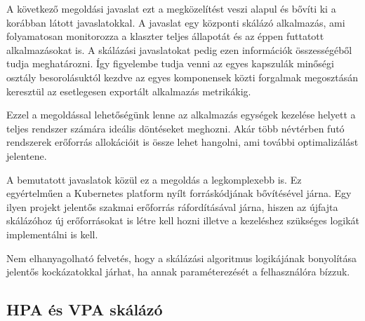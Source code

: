 A következő megoldási javaslat ezt a megközelítést veszi alapul és bővíti ki a korábban látott javaslatokkal.
A javaslat egy központi skálázó alkalmazás, ami folyamatosan monitorozza a klaszter teljes állapotát és az éppen futtatott alkalmazásokat is.
A skálázási javaslatokat pedig ezen információk összességéből tudja meghatározni.
Így figyelembe tudja venni az egyes kapszulák minőségi osztály besorolásuktól kezdve az egyes komponensek közti forgalmak megosztásán keresztül az esetlegesen exportált alkalmazás metrikákig.

Ezzel a megoldással lehetőségünk lenne az alkalmazás egységek kezelése helyett a teljes rendszer számára ideális döntéseket meghozni.
Akár több névtérben futó rendszerek erőforrás allokációit is össze lehet hangolni, ami további optimalizálást jelentene.

A bemutatott javaslatok közül ez a megoldás a legkomplexebb is. 
Ez egyértelműen a Kubernetes platform nyílt forráskódjának bővítésével járna.
Egy ilyen projekt jelentős szakmai erőforrás ráfordításával járna, hiszen az újfajta skálázóhoz új erőforrásokat is létre kell hozni illetve a kezeléshez szükséges logikát implementálni is kell.

Nem elhanyagolható felvetés, hogy a skálázási algoritmus logikájának bonyolítása jelentős kockázatokkal járhat, ha annak paraméterezését a felhasználóra bízzuk.


\subsection{HPA és VPA skálázó}





